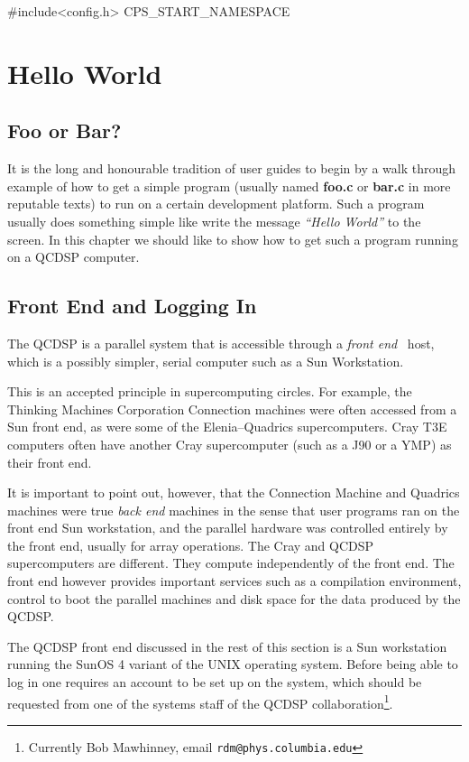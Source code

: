 #include<config.h>
CPS_START_NAMESPACE
\chapter{Hello World}\label{c:HelloWorld}
\section{Foo or Bar?}
It is the long and honourable tradition of user guides to 
begin by a walk through example of how to get a simple program
(usually named {\bf foo.c} or {\bf bar.c} in more reputable 
texts) to run on a certain development platform. Such a program
usually does something simple like write the message {\em ``Hello World''}
to the screen. In this chapter we should like to show how to 
get such a program running on a QCDSP computer.

\section{Front End and Logging In}
The QCDSP is a parallel system that is accessible through a {\em front end}
 \ host, which is a possibly simpler, serial computer such as a Sun Workstation.

This is an accepted principle in supercomputing circles. For example,
the Thinking Machines Corporation Connection machines were often 
accessed from a Sun front end, as were some of the Elenia--Quadrics
supercomputers. Cray T3E computers often have another Cray supercomputer 
(such as a J90 or a YMP) as their front end.

It is important to point out, however, that the Connection Machine and 
Quadrics machines were true {\em back end} machines in the sense that
user programs ran on the front end Sun workstation, and the parallel hardware
was controlled entirely by the front end, usually for array operations.
The Cray and QCDSP supercomputers are different. They compute independently
of the front end. The front end however provides important services such
as a compilation environment, control to boot the parallel machines and
disk space for the data produced by the QCDSP. 

The QCDSP front end discussed in the rest of this section is a Sun
workstation running the SunOS 4 variant of the UNIX operating system.
Before being able to log in one requires an account to be set up
on the system, which should be requested from one of the systems staff
of the QCDSP collaboration\footnote{Currently Bob Mawhinney, email {\tt rdm@phys.columbia.edu}}.

